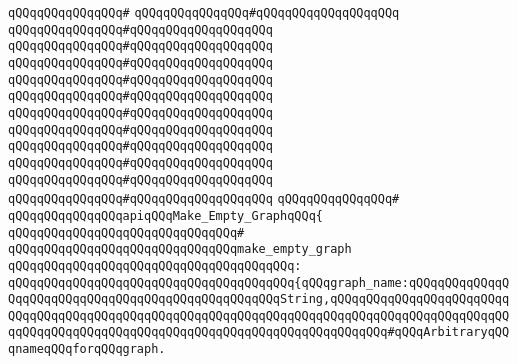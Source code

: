 \verb|qQQqqQQqqQQqqQQq#|\newline
\verb|qQQqqQQqqQQqqQQq#qQQqqQQqqQQqqQQqqQQq|\newline
\verb|qQQqqQQqqQQqqQQq#qQQqqQQqqQQqqQQqqQQq|\newline
\verb|qQQqqQQqqQQqqQQq#qQQqqQQqqQQqqQQqqQQq|\newline
\verb|qQQqqQQqqQQqqQQq#qQQqqQQqqQQqqQQqqQQq|\newline
\verb|qQQqqQQqqQQqqQQq#qQQqqQQqqQQqqQQqqQQq|\newline
\verb|qQQqqQQqqQQqqQQq#qQQqqQQqqQQqqQQqqQQq|\newline
\verb|qQQqqQQqqQQqqQQq#qQQqqQQqqQQqqQQqqQQq|\newline
\verb|qQQqqQQqqQQqqQQq#qQQqqQQqqQQqqQQqqQQq|\newline
\verb|qQQqqQQqqQQqqQQq#qQQqqQQqqQQqqQQqqQQq|\newline
\verb|qQQqqQQqqQQqqQQq#qQQqqQQqqQQqqQQqqQQq|\newline
\verb|qQQqqQQqqQQqqQQq#qQQqqQQqqQQqqQQqqQQq|\newline
\verb|qQQqqQQqqQQqqQQq#qQQqqQQqqQQqqQQqqQQq|\newline
\verb|qQQqqQQqqQQqqQQq#|\newline
\verb|qQQqqQQqqQQqqQQqapiqQQqMake_Empty_GraphqQQq{|\newline
\verb|qQQqqQQqqQQqqQQqqQQqqQQqqQQqqQQq#|\newline
\verb|qQQqqQQqqQQqqQQqqQQqqQQqqQQqqQQqmake_empty_graph|\newline
\verb|qQQqqQQqqQQqqQQqqQQqqQQqqQQqqQQqqQQqqQQq:|\newline
\verb|qQQqqQQqqQQqqQQqqQQqqQQqqQQqqQQqqQQqqQQq{qQQqgraph_name:qQQqqQQqqQQqqQQqqQQqqQQqqQQqqQQqqQQqqQQqqQQqqQQqqQQqString,qQQqqQQqqQQqqQQqqQQqqQQqqQQqqQQqqQQqqQQqqQQqqQQqqQQqqQQqqQQqqQQqqQQqqQQqqQQqqQQqqQQqqQQqqQQqqQQqqQQqqQQqqQQqqQQqqQQqqQQqqQQqqQQqqQQqqQQqqQQqqQQqqQQq#qQQqArbitraryqQQqnameqQQqforqQQqgraph.|\newline
